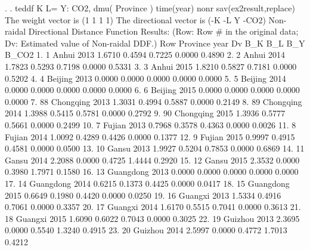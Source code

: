 . 
. teddf K L= Y: CO2, dmu( Province ) time(year) nonr sav(ex2result,replace)
{\smallskip}
 The weight vector is (1 1 1 1)
{\smallskip}
 The directional vector is (-K -L Y -CO2)
{\smallskip}
{\smallskip}
 Non-raidal Directional Distance Function Results:
    (Row: Row \# in the original data; Dv: Estimated value of Non-raidal DDF.)
{\smallskip}
     {\TLC}
     {\VBAR} Row       Province   year       Dv      B_K      B_L      B_Y    B_CO2 {\VBAR}
     {\LFTT}
  1. {\VBAR}   1          Anhui   2013   1.6710   0.4594   0.7225   0.0000   0.4890 {\VBAR}
  2. {\VBAR}   2          Anhui   2014   1.7823   0.5293   0.7198   0.0000   0.5331 {\VBAR}
  3. {\VBAR}   3          Anhui   2015   1.8210   0.5827   0.7181   0.0000   0.5202 {\VBAR}
  4. {\VBAR}   4        Beijing   2013   0.0000   0.0000   0.0000   0.0000   0.0000 {\VBAR}
  5. {\VBAR}   5        Beijing   2014   0.0000   0.0000   0.0000   0.0000   0.0000 {\VBAR}
  6. {\VBAR}   6        Beijing   2015   0.0000   0.0000   0.0000   0.0000   0.0000 {\VBAR}
  7. {\VBAR}  88      Chongqing   2013   1.3031   0.4994   0.5887   0.0000   0.2149 {\VBAR}
  8. {\VBAR}  89      Chongqing   2014   1.3988   0.5415   0.5781   0.0000   0.2792 {\VBAR}
  9. {\VBAR}  90      Chongqing   2015   1.3936   0.5777   0.5661   0.0000   0.2499 {\VBAR}
 10. {\VBAR}   7         Fujian   2013   0.7968   0.3578   0.4363   0.0000   0.0026 {\VBAR}
 11. {\VBAR}   8         Fujian   2014   1.0092   0.4289   0.4426   0.0000   0.1377 {\VBAR}
 12. {\VBAR}   9         Fujian   2015   0.9997   0.4915   0.4581   0.0000   0.0500 {\VBAR}
 13. {\VBAR}  10          Gansu   2013   1.9927   0.5204   0.7853   0.0000   0.6869 {\VBAR}
 14. {\VBAR}  11          Gansu   2014   2.2088   0.0000   0.4725   1.4444   0.2920 {\VBAR}
 15. {\VBAR}  12          Gansu   2015   2.3532   0.0000   0.3980   1.7971   0.1580 {\VBAR}
 16. {\VBAR}  13      Guangdong   2013   0.0000   0.0000   0.0000   0.0000   0.0000 {\VBAR}
 17. {\VBAR}  14      Guangdong   2014   0.6215   0.1373   0.4425   0.0000   0.0417 {\VBAR}
 18. {\VBAR}  15      Guangdong   2015   0.6649   0.1980   0.4420   0.0000   0.0250 {\VBAR}
 19. {\VBAR}  16        Guangxi   2013   1.5334   0.4916   0.7061   0.0000   0.3357 {\VBAR}
 20. {\VBAR}  17        Guangxi   2014   1.6170   0.5515   0.7041   0.0000   0.3613 {\VBAR}
 21. {\VBAR}  18        Guangxi   2015   1.6090   0.6022   0.7043   0.0000   0.3025 {\VBAR}
 22. {\VBAR}  19        Guizhou   2013   2.3695   0.0000   0.5540   1.3240   0.4915 {\VBAR}
 23. {\VBAR}  20        Guizhou   2014   2.5997   0.0000   0.4772   1.7013   0.4212 {\VBAR}
